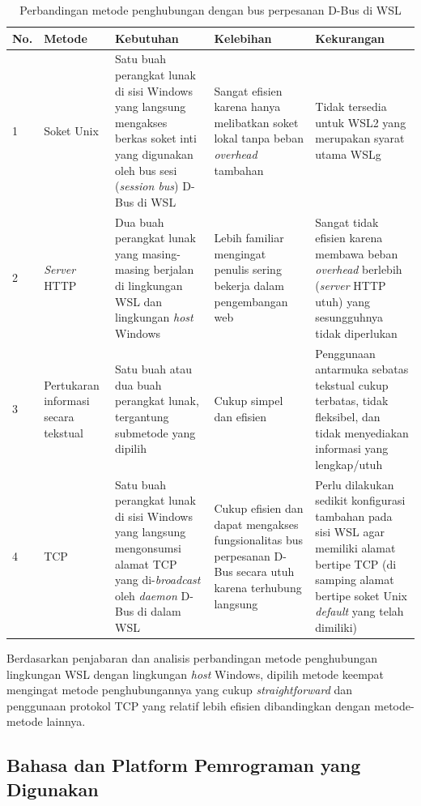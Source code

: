 \begin{table}
    \centering
    \caption{Perbandingan metode penghubungan dengan bus perpesanan D-Bus di WSL}
    \label{perbandingan-metode-penghubungan-dengan-dbus-di-wsl}
    \begin{tabularx}{\textwidth}{|l|p{2.5cm}|X|X|X|} \hline
        \textbf{No.} & \textbf{Metode} & \textbf{Kebutuhan} & \textbf{Kelebihan} & \textbf{Kekurangan}\\ \hline
        1 & Soket Unix & Satu buah perangkat lunak di sisi Windows yang langsung mengakses berkas soket inti yang digunakan oleh bus sesi (\textit{session bus}) D-Bus di WSL & Sangat efisien karena hanya melibatkan soket lokal tanpa beban \textit{overhead} tambahan & Tidak tersedia untuk WSL2 yang merupakan syarat utama WSLg\\ \hline
        2 & \textit{Server} HTTP & Dua buah perangkat lunak yang masing-masing berjalan di lingkungan WSL dan lingkungan \textit{host} Windows & Lebih familiar mengingat penulis sering bekerja dalam pengembangan web & Sangat tidak efisien karena membawa beban \textit{overhead} berlebih (\textit{server} HTTP utuh) yang sesungguhnya tidak diperlukan\\ \hline
        3 & Pertukaran informasi secara tekstual & Satu buah atau dua buah perangkat lunak, tergantung submetode yang dipilih & Cukup simpel dan efisien & Penggunaan antarmuka sebatas tekstual cukup terbatas, tidak fleksibel, dan tidak menyediakan informasi yang lengkap/utuh\\ \hline
        4 & TCP & Satu buah perangkat lunak di sisi Windows yang langsung mengonsumsi alamat TCP yang di-\textit{broadcast} oleh \textit{daemon} D-Bus di dalam WSL & Cukup efisien dan dapat mengakses fungsionalitas bus perpesanan D-Bus secara utuh karena terhubung langsung & Perlu dilakukan sedikit konfigurasi tambahan pada sisi WSL agar memiliki alamat bertipe TCP (di samping alamat bertipe soket Unix \textit{default} yang telah dimiliki)\\ \hline
    \end{tabularx}
\end{table}


Berdasarkan penjabaran dan analisis perbandingan metode penghubungan lingkungan WSL dengan lingkungan \textit{host} Windows, dipilih metode keempat mengingat metode penghubungannya yang cukup \textit{straightforward} dan penggunaan protokol TCP yang relatif lebih efisien dibandingkan dengan metode-metode lainnya.

\subsection{Bahasa dan Platform Pemrograman yang Digunakan}

